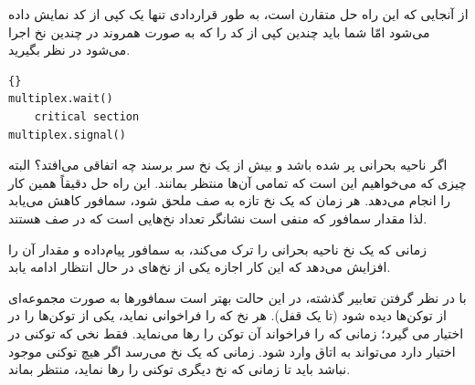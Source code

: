 \documentclass{book}
\begin{document}
    از آنجایی که این راه حل متقارن است، به طور قراردادی تنها یک کپی از کد نمایش داده می‌شود امّا شما باید چندین کپی از کد را که به صورت همروند 
    در چندین نخ اجرا می‌شود در نظر بگیرید. 

\begin{latin}
\begin{latin}
\begin{lstlisting}[title=\rl{ راه حل مالتی‌پلکس}]{}
multiplex.wait()
    critical section 
multiplex.signal()      
\end{lstlisting}
\end{latin}
\end{latin}

    اگر ناحیه بحرانی پر شده باشد و بیش از یک نخ سر برسند چه اتفاقی می‌افتد؟ البته چیزی که می‌خواهیم این است که تمامی آن‌ها منتظر بمانند. 
    این راه حل دقیقاً همین کار را انجام می‌دهد. هر زمان که یک نخ تازه به صف ملحق شود، سمافور کاهش می‌یابد لذا مقدار سمافور که 
    منفی است نشانگر تعداد نخ‌هایی است که در صف هستند. 
    
    زمانی که یک نخ ناحیه بحرانی را ترک می‌کند، به سمافور پیام‌داده و مقدار آن را افزایش می‌دهد که این کار اجازه یکی از نخ‌های در حال انتظار ادامه یابد. 

    با در نظر گرفتن تعابیر گذشته،‌ در این حالت بهتر است سمافورها به صورت مجموعه‌ای از توکن‌ها دیده شود (تا یک قفل). 
    هر نخ که  را فراخوانی نماید،  یکی از توکن‌ها را در اختیار می گیرد؛‌ زمانی که  را فراخواند 
    آن توکن را رها می‌نماید. فقط نخی که توکنی در اختیار دارد می‌تواند به اتاق وارد شود.  زمانی که یک نخ می‌رسد اگر هیچ توکنی موجود نباشد 
    باید تا زمانی که نخ دیگری توکنی را رها نماید، منتظر بماند. 
\end{document}
